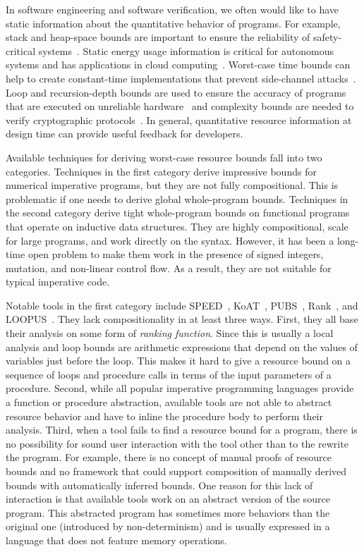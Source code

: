 \documentclass[nocopyrightspace,preprint,pldi]{sigplanconf-pldi15}
\begin{document}
In software engineering and software verification,
we often would like to have static information
about the quantitative behavior of programs.
For example, stack and heap-space bounds
are important to ensure the reliability of
safety-critical systems~\cite{veristack14,Regehr05}.
Static energy usage information is critical
for autonomous systems and has applications in
cloud computing~\cite{CohenZSL12,CarrollH10}.
Worst-case time bounds can help to create
constant-time implementations that prevent
side-channel attacks~\cite{KasperS09,BartheBCLP14}.
Loop and recursion-depth bounds are used to
ensure the accuracy of programs that are executed
on unreliable hardware~\cite{CarbinMR13} and
complexity bounds are needed to verify cryptographic
protocols~\cite{BartheGB09}.  In general, quantitative
resource information at design time can provide useful
feedback for developers.





Available techniques for deriving worst-case resource bounds
fall into two categories.  Techniques
in the first category derive impressive bounds for
numerical imperative programs, but they are not fully compositional.
This is problematic if one needs to derive global whole-program bounds.
Techniques in the second category derive tight whole-program
bounds on functional programs that operate on inductive data structures.
They are highly compositional, scale for large
programs, and work directly on the syntax.  However, %
it has been
a long-time open problem to make them work in the
presence of signed integers, mutation, and non-linear
control flow. As a result, they are not suitable for
typical imperative code.

Notable tools in the first category include
SPEED~\cite{GulwaniMC09}, KoAT~\cite{BrockschmidtEFFG14},
PUBS~\cite{AlbertAGPZ12}, Rank~\cite{AliasDFG10},
and LOOPUS~\cite{SinnZV14}.
They lack compositionality in at least three ways.
First, they all base their analysis on some form of
\emph{ranking function}.
Since this
is usually a local analysis and loop bounds are
arithmetic expressions that depend on the values of
variables just before the loop.
This makes it hard to give a
resource bound on a sequence of loops and procedure calls in
terms of the input parameters of a procedure.
Second, while all popular imperative programming languages
provide a function or procedure abstraction, available
tools are not able to abstract resource behavior
and have to inline the procedure body to perform their
analysis.  Third, when a tool fails to find a resource
bound for a program, there is no possibility for sound
user interaction with the tool other than to the rewrite
the program. For example, there is no concept of manual proofs of
resource bounds and no framework that could support composition
of manually derived bounds with automatically inferred bounds.
One reason for this lack of interaction is that available tools
work on an abstract version of the source program. This
abstracted program has sometimes more behaviors than the
original one (introduced by non-determinism) and is usually
expressed in a language that does not feature memory operations.
\end{document}
